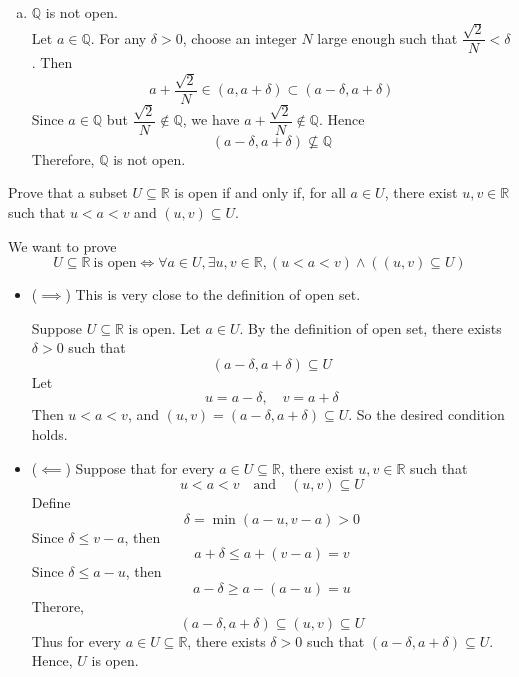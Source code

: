 \begin{mysolution}
\begin{enumerate}[(a)]
    \[p < a < p+1, \quad \text{where}\ p=\floor{a}\]
    Choose 
    \[\delta=\min(a-p, p+1-a) > 0\]
    Since $\delta \le p+1-a$, then 
    \[a+\delta \le a+(p+1-a) = p+1\]
    Since $\delta \le a-p$, then 
    \[a-\delta \ge a-(a-p) = p\]
    Hence,
    \[(a-\delta, a+\delta) \subseteq (p, p+1) \subseteq \mathbb{R} \setminus \mathbb{Z}\]
    Therefore, $\mathbb{R} \setminus \mathbb{Z}$ is open.
    \item $\mathbb{Q}$ is not open.\\
    Let $a \in \mathbb{Q}$. For any $\delta>0$, choose an integer $N$ large enough such that $\dfrac{\sqrt{2}}{N} < \delta$. Then
    \[a+\dfrac{\sqrt{2}}{N} \in (a, a+\delta) \subset (a-\delta, a+\delta) \]
    Since $a \in \mathbb{Q}$ but $\dfrac{\sqrt{2}}{N} \notin \mathbb{Q}$, we have $a+\dfrac{\sqrt{2}}{N} \notin \mathbb{Q}$. Hence
    \[(a-\delta, a+\delta) \nsubseteq \mathbb{Q}\]
    Therefore, $\mathbb{Q}$ is not open.
    \end{enumerate}
\end{mysolution}

\begin{chapex}
Prove that a subset $U \subseteq \mathbb{R}$ is open if and only if, for all $a \in U$, there exist $u,v \in \mathbb{R}$ such that $u<a<v$ and $(u,v) \subseteq U$.
\end{chapex}

\begin{myproof}
    We want to prove
    $$
    U \subseteq \mathbb{R}\ \text{is open} \iff \forall a \in U, \exists u,v \in \mathbb{R}, (u<a<v) \land \left((u,v) \subseteq U\right)
    $$
    \begin{itemize}
        \item ($\implies$) This is very close to the definition of open set.
        
        Suppose $U \subseteq \mathbb{R}$ is open. Let $a \in U$. By the definition of open set, there exists $\delta>0$ such that
        \[(a-\delta,a+\delta) \subseteq U\]
        Let
        \[u=a-\delta, \quad v=a+\delta\]
        Then $u<a<v$, and $(u,v) = (a-\delta,a+\delta) \subseteq U$.
        So the desired condition holds.
        \item ($\impliedby$) Suppose that for every $a \in U \subseteq \mathbb{R}$, there exist $u,v \in \mathbb{R}$ such that
        \[u<a<v \quad \text{and} \quad (u,v) \subseteq U\]
        Define
        \[\delta = \min(a-u, v-a)>0\]
        Since $\delta \le v-a$, then 
        \[a+\delta \le a+(v-a)=v\]
        Since $\delta \le a-u$, then
        \[a-\delta \ge a-(a-u)=u\]
        Therore,
        \[(a-\delta,a+\delta) \subseteq (u,v) \subseteq U\]
        Thus for every $a \in U \subseteq \mathbb{R}$, there exists $\delta > 0$ such that $(a-\delta, a+\delta) \subseteq U$. Hence, $U$ is open.
    \end{itemize}
\end{myproof}

